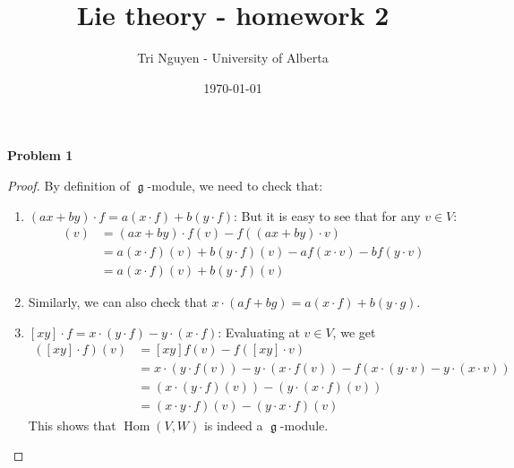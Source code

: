 \documentclass[12pt]{article} %
\title{Lie theory - homework 2} %
\author{Tri Nguyen - University of Alberta} %
\date{\today} %
\DeclareMathOperator{\Hom}{Hom}
\DeclareMathOperator{\frkg}{\mathfrak{g}}
\begin{document}
\maketitle
\textbf{Problem 1}
\begin{proof}
    By definition of $\frkg$-module, we need to check that:
\begin{enumerate}
    \item $(ax+by)\cdot f = a(x\cdot f)+ b(y\cdot f)$: But it is easy to see that for any $v \in V$:
   \begin{align*}
    [(ax+by) \cdot f](v) &= (ax+by)\cdot f(v)- f((ax+by)\cdot v) \\
    &= a(x\cdot f)(v)+b(y\cdot f)(v) - af(x\cdot v)-b f(y\cdot v)\\
    &= a(x\cdot f)(v)+b(y\cdot f)(v)
   \end{align*}
   \item Similarly, we can also check that $x\cdot(af+bg) = a(x\cdot f)+ b(y \cdot g)$.
   \item $[xy]\cdot f = x\cdot (y\cdot f)-y\cdot (x \cdot f)$: Evaluating at $v \in V$, we get 
        \begin{align*}
            ([xy]\cdot f)(v)&= [xy]f(v)-f([xy]\cdot v)\\
            &=x\cdot (y\cdot f(v))-y\cdot(x\cdot f(v))-f(x\cdot (y\cdot v)-y\cdot(x\cdot v))\\
            &= (x\cdot (y\cdot f)(v))-(y\cdot (x\cdot f)(v))\\
            &=(x\cdot y\cdot f)(v)- (y\cdot x \cdot f)(v)
        \end{align*}
    This shows that $\Hom(V,W)$ is indeed a $\frkg$-module.
\end{enumerate}


\end{proof}
\end{document}
